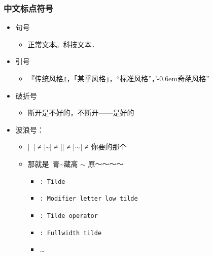 \begin{frame}[fragile]
\frametitle{中文标点符号}
\begin{itemize}
  \item<+-> 句号

    \begin{itemize}
      \item 正常文本。科技文本．
    \end{itemize}

  \item<+-> 引号

    \begin{itemize}
      \item 『传统风格』，「某乎风格」，“标准风格”，\mbox{}’\kern-0.6em奇葩风格”
    \end{itemize}

  \item<+-> 破折号

    \begin{itemize}
      \item 断开是不好的，不断开——是好的
    \end{itemize}

  \item<+-> 波浪号：

    \begin{itemize}
      \item |~| ≠ |\textasciitilde| ≠ |\texttildelow| ≠ |$\sim$| ≠ 你要的那个
      \item 那就是~青\textasciitilde 藏\texttildelow 高 $\sim$ 原～～～～

        \begin{itemize}
          \item \texttt{: Tilde}
          \item \texttt{: Modifier letter low tilde}
          \item \texttt{: Tilde operator}
          \item \texttt{: Fullwidth tilde}
          \item \ldots{}
        \end{itemize}
    \end{itemize}
\end{itemize}
\end{frame}

